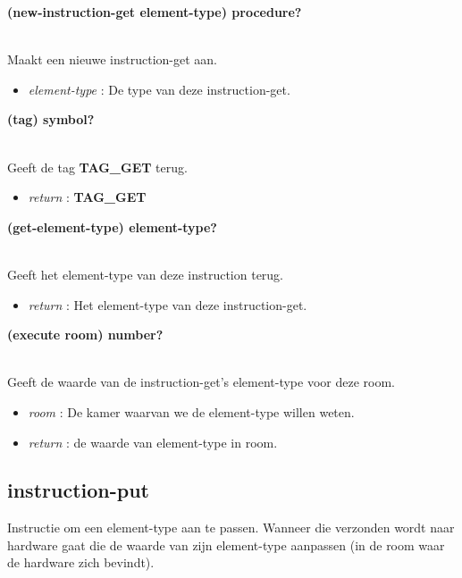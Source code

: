 \documentclass{article}
\newcommand{\ar}{\ding{213} }
\newcommand{\code}[1]{\textcolor{code}{#1}}
\newcommand{\lb}[1][]{\code{(#1}}
\newcommand{\rb}{\code{)}}
\newcommand{\racket}[1]{
	{\color{blue}\textbf{#1}}
}
\begin{document}
\begin{framed}
	\hypertarget{instruction-get:new-instruction-get}{\racket{\lb[new-instruction-get] element-type\rb \ar \code{procedure?}}}
	\\Maakt een nieuwe instruction-get aan.
	\begin{itemize}
		\item \emph{element-type} : De type van deze instruction-get.
	\end{itemize}
\end{framed}

\begin{framed}
	\hypertarget{instruction-get:tag}{\racket{\lb[tag]\rb \ar \code{symbol?}}}
	\\Geeft de tag \racket{TAG\_GET} terug.
	\begin{itemize}
		\item \emph{return} : \racket{TAG\_GET}
	\end{itemize}
\end{framed}

\begin{framed}
	\hypertarget{instruction-get:get-element-type}{\racket{\lb[get-element-type]\rb \ar \code{element-type?}}}
	\\Geeft het element-type van deze instruction terug.
	\begin{itemize}
		\item \emph{return} : Het element-type van deze instruction-get.
	\end{itemize}
\end{framed}

\begin{framed}
	\hypertarget{instruction-get:execute}{\racket{\lb[execute] room\rb \ar \code{number?}}}
	\\Geeft de waarde van de instruction-get's element-type voor deze room.
	\begin{itemize}
		\item \emph{room} : De kamer waarvan we de element-type willen weten.
		\item \emph{return} : de waarde van element-type in room.
	\end{itemize}
\end{framed}

\newpage
\hypertarget{instruction-put}{\subsection{instruction-put}}
Instructie om een element-type aan te passen. Wanneer die verzonden wordt naar hardware gaat die de waarde van zijn element-type aanpassen (in de room waar de hardware zich bevindt).
\end{document}
